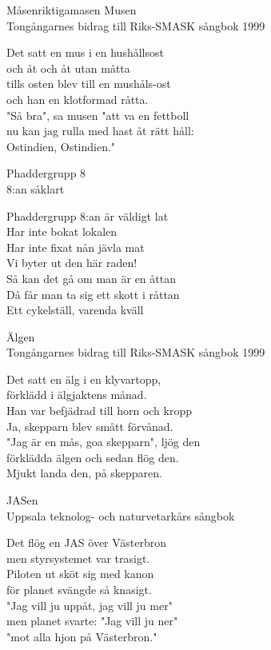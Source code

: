 \begin{song}{Måsen}{riktigamasen}
  {\Large Musen}\\{\tiny  Tongångarnes bidrag till Riks-SMASK sångbok 1999}
  \begin{vers}
Det satt en mus i en hushållsost \\
och åt och åt utan måtta \\
tills osten blev till en mushåls-ost \\
och han en klotformad råtta. \\
"Så bra", sa musen "att va en fettboll \\
nu kan jag rulla med hast åt rätt håll:\\ 
Ostindien, Ostindien."\\ 
\end{vers}
 

  {\Large Phaddergrupp 8}\\{\tiny  8:an såklart}
  \begin{vers}
Phaddergrupp 8:an är väldigt lat\\
Har inte bokat lokalen\\
Har inte fixat nån jävla mat\\
Vi byter ut den här raden!\\
Så kan det gå om man är en åttan\\
Då får man ta sig ett skott i råttan\\
Ett cykelställ, varenda kväll\\
\end{vers}
 

  {\Large Älgen}\\{\tiny  Tongångarnes bidrag till Riks-SMASK sångbok 1999}
  \begin{vers}
Det satt en älg i en klyvartopp, \\
förklädd i älgjaktens månad. \\
Han var befjädrad till horn och kropp \\
Ja, skepparn blev smått förvånad. \\
"Jag är en mås, goa skepparn", ljög den \\
förklädda älgen och sedan flög den. \\
Mjukt landa den, på skepparen. \\
\end{vers}
 

  {\Large JASen}\\{\tiny  Uppsala teknolog- och naturvetarkårs sångbok}
  \begin{vers}
Det flög en JAS över Västerbron \\
men styrsystemet var trasigt. \\
Piloten ut sköt sig med kanon \\
för planet svängde så knasigt. \\
"Jag vill ju uppåt, jag vill ju mer" \\
men planet svarte: "Jag vill ju ner" \\
"mot alla hjon på Västerbron." \\
\end{vers}
 

\end{song}

